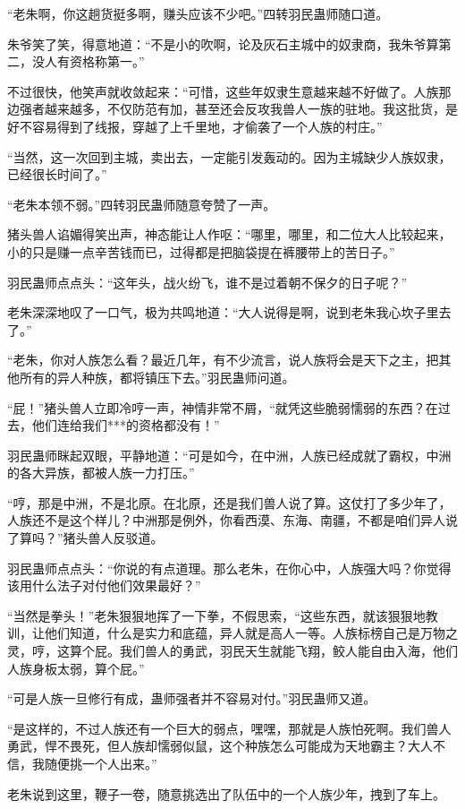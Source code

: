 \begin{this_body}
“老朱啊，你这趟货挺多啊，赚头应该不少吧。”四转羽民蛊师随口道。

朱爷笑了笑，得意地道：“不是小的吹啊，论及灰石主城中的奴隶商，我朱爷算第二，没人有资格称第一。”

不过很快，他笑声就收敛起来：“可惜，这些年奴隶生意越来越不好做了。人族那边强者越来越多，不仅防范有加，甚至还会反攻我兽人一族的驻地。我这批货，是好不容易得到了线报，穿越了上千里地，才偷袭了一个人族的村庄。”

“当然，这一次回到主城，卖出去，一定能引发轰动的。因为主城缺少人族奴隶，已经很长时间了。”

“老朱本领不弱。”四转羽民蛊师随意夸赞了一声。

猪头兽人谄媚得笑出声，神态能让人作呕：“哪里，哪里，和二位大人比较起来，小的只是赚一点辛苦钱而已，过得都是把脑袋提在裤腰带上的苦日子。”

羽民蛊师点点头：“这年头，战火纷飞，谁不是过着朝不保夕的日子呢？”

老朱深深地叹了一口气，极为共鸣地道：“大人说得是啊，说到老朱我心坎子里去了。”

“老朱，你对人族怎么看？最近几年，有不少流言，说人族将会是天下之主，把其他所有的异人种族，都将镇压下去。”羽民蛊师问道。

“屁！”猪头兽人立即冷哼一声，神情非常不屑，“就凭这些脆弱懦弱的东西？在过去，他们连给我们***的资格都没有！”

羽民蛊师眯起双眼，平静地道：“可是如今，在中洲，人族已经成就了霸权，中洲的各大异族，都被人族一力打压。”

“哼，那是中洲，不是北原。在北原，还是我们兽人说了算。这仗打了多少年了，人族还不是这个样儿？中洲那是例外，你看西漠、东海、南疆，不都是咱们异人说了算吗？”猪头兽人反驳道。

羽民蛊师点点头：“你说的有点道理。那么老朱，在你心中，人族强大吗？你觉得该用什么法子对付他们效果最好？”

“当然是拳头！”老朱狠狠地挥了一下拳，不假思索，“这些东西，就该狠狠地教训，让他们知道，什么是实力和底蕴，异人就是高人一等。人族标榜自己是万物之灵，哼，这算个屁。我们兽人的勇武，羽民天生就能飞翔，鲛人能自由入海，他们人族身板太弱，算个屁。”

“可是人族一旦修行有成，蛊师强者并不容易对付。”羽民蛊师又道。

“是这样的，不过人族还有一个巨大的弱点，嘿嘿，那就是人族怕死啊。我们兽人勇武，悍不畏死，但人族却懦弱似鼠，这个种族怎么可能成为天地霸主？大人不信，我随便挑一个人出来。”

老朱说到这里，鞭子一卷，随意挑选出了队伍中的一个人族少年，拽到了车上。


\end{this_body}
